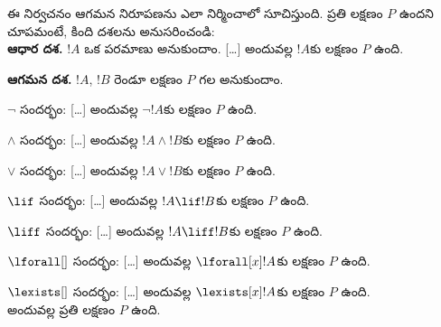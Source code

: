\documentclass[../../../include/open-logic-section]{subfiles}
\begin{document}
\begin{explain}
ఈ నిర్వచనం  ఆగమన నిరూపణను ఎలా నిర్మించాలో సూచిస్తుంది. ప్రతి  లక్షణం $P$ ఉందని చూపమంటే, కింది దశలను అనుసరించండి:\\

\textbf{ఆధార దశ.} $!A$ ఒక పరమాణు  అనుకుందాం. [\ldots] అందువల్ల $!A$కు లక్షణం $P$ ఉంది.

\textbf{ఆగమన దశ.} $!A$, $!B$ రెండూ లక్షణం $P$ గల  అనుకుందాం.

$\lnot$ సందర్భం: [\ldots] అందువల్ల $\lnot !A$కు లక్షణం $P$ ఉంది.

$\land$ సందర్భం: [\ldots] అందువల్ల $!A \land !B$కు లక్షణం $P$ ఉంది.

$\lor$ సందర్భం: [\ldots] అందువల్ల $!A \lor !B$కు లక్షణం $P$ ఉంది.

$\lif$ సందర్భం: [\ldots] అందువల్ల $!A \lif !B$కు లక్షణం $P$ ఉంది.

$\liff$ సందర్భం: [\ldots] అందువల్ల $!A \liff !B$కు లక్షణం $P$ ఉంది.

$\lforall[]$ సందర్భం: [\ldots] అందువల్ల $\lforall[x] !A$కు లక్షణం $P$ ఉంది.

$\lexists[]$ సందర్భం: [\ldots] అందువల్ల $\lexists[x] !A$కు లక్షణం $P$ ఉంది. \\

అందువల్ల ప్రతి  లక్షణం $P$ ఉంది.
\end{explain}
\end{document}
